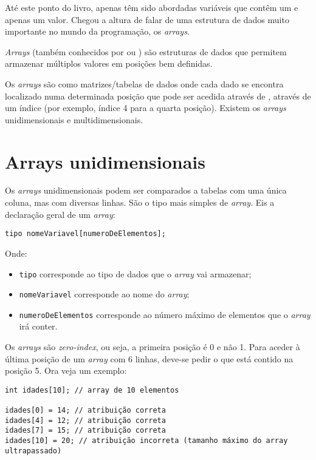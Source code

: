 Até este ponto do livro, apenas têm sido abordadas variáveis que contêm um e apenas um valor. Chegou a altura de falar de uma estrutura de dados muito importante no mundo da programação, os \textit{arrays}.

\begin{defi}
\textit{Arrays} (também conhecidos por  ou ) são estruturas de dados que permitem armazenar múltiplos valores em posições bem definidas.
\end{defi}

Os \textit{arrays} são como matrizes/tabelas de dados onde cada dado se encontra localizado numa determinada posição que pode ser acedida através de , através de um índice (por exemplo, índice 4 para a quarta posição). Existem os \textit{arrays} unidimensionais e multidimensionais.

\section{Arrays unidimensionais}

Os \textit{arrays} unidimensionais podem ser comparados a tabelas com uma única coluna, mas com diversas linhas. São o tipo mais simples de \textit{array}. Eis a declaração geral de um \textit{array}:

\begin{lstlisting}
tipo nomeVariavel[numeroDeElementos];
\end{lstlisting}

Onde:

\begin{itemize}
\item \texttt{tipo} corresponde ao tipo de dados que o \textit{array} vai armazenar;
\item \texttt{nomeVariavel} corresponde ao nome do \textit{array};
\item \texttt{numeroDeElementos} corresponde ao número máximo de elementos que o \textit{array} irá conter.
\end{itemize}

Os \textit{arrays} são \textit{zero-index}, ou seja, a primeira posição é 0 e não 1. Para aceder à última posição de um \textit{array} com 6 linhas, deve-se pedir o que está contido na posição 5. Ora veja um exemplo:

\begin{lstlisting}
int idades[10]; // array de 10 elementos
 
idades[0] = 14; // atribuição correta
idades[4] = 12; // atribuição correta
idades[7] = 15; // atribuição correta
idades[10] = 20; // atribuição incorreta (tamanho máximo do array ultrapassado)
\end{lstlisting}

